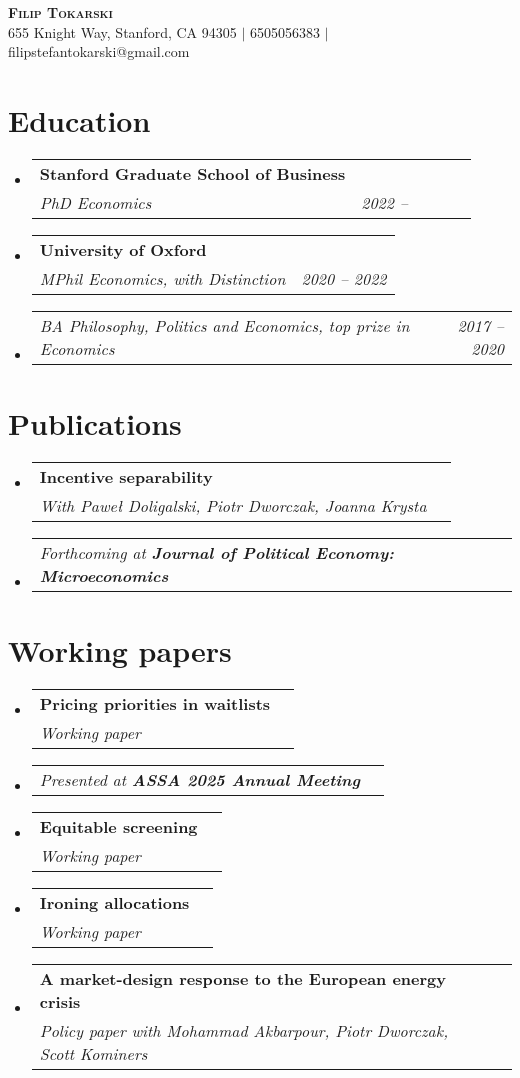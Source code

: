 \documentclass[letterpaper,11pt]{article}
\makeatletter
\newcommand{\resumeSubheading}[3]{
  \vspace{-2pt}\item
    \begin{tabular*}{0.97\textwidth}[t]{l@{\extracolsep{\fill}}r}
      \textbf{#1} \\
      \textit{\small#2} & \textit{\small #3} \\
    \end{tabular*}\vspace{-7pt}
}
\newcommand{\resumeSubSubheading}[2]{
    \item
    \begin{tabular*}{0.97\textwidth}{l@{\extracolsep{\fill}}r}
      \textit{\small#1} & \textit{\small #2} \\
    \end{tabular*}\vspace{-7pt}
}
\newcommand{\resumeSubHeadingListStart}{\begin{itemize}[leftmargin=0.15in, label={}]}
\newcommand{\resumeSubHeadingListEnd}{\end{itemize}}
\makeatother
\begin{document}
\begin{center}
    \textbf{\Huge \scshape Filip Tokarski} \\ \vspace{1pt}
    \small 655 Knight Way, Stanford, CA 94305 $|$
    \small 6505056383 $|$
    \small filipstefantokarski@gmail.com %
\end{center}



\section{Education}
  \resumeSubHeadingListStart
    \resumeSubheading
      {Stanford Graduate School of Business}
      {PhD Economics}{2022 -- \ \ \ \ \ \ }
    \resumeSubHeadingListEnd
  \resumeSubHeadingListStart
    \resumeSubheading
      {University of Oxford}
      {MPhil Economics, with Distinction}{2020 -- 2022}
        \resumeSubSubheading
      {BA Philosophy, Politics and Economics, top prize in Economics}{2017 -- 2020}
  \resumeSubHeadingListEnd

\vspace{0.15cm}

\section{Publications}
  \resumeSubHeadingListStart
  \resumeSubheading
      {Incentive separability}
      {With Pawe\l{} Doligalski, Piotr Dworczak, Joanna Krysta}{}
      \vspace*{-0.25cm}
      \resumeSubSubheading
      {Forthcoming at \textbf{Journal of Political Economy: Microeconomics}}{}
  \resumeSubHeadingListEnd

\vspace{0.15cm}


\section{Working papers}
\resumeSubHeadingListStart
\resumeSubheading
{Pricing priorities in waitlists}
{Working paper}{}
  \vspace*{-0.25cm}
  \resumeSubSubheading
  {Presented at \textbf{ASSA 2025 Annual Meeting}}{}
  \resumeSubheading
  {Equitable screening}
  {Working paper}{}
    \resumeSubheading
    {Ironing allocations}
    {Working paper}{}
    \resumeSubheading
      {A market-design response to the European energy crisis}
      {Policy paper with Mohammad Akbarpour, Piotr Dworczak, Scott Kominers}{}
  \resumeSubHeadingListEnd
\end{document}

